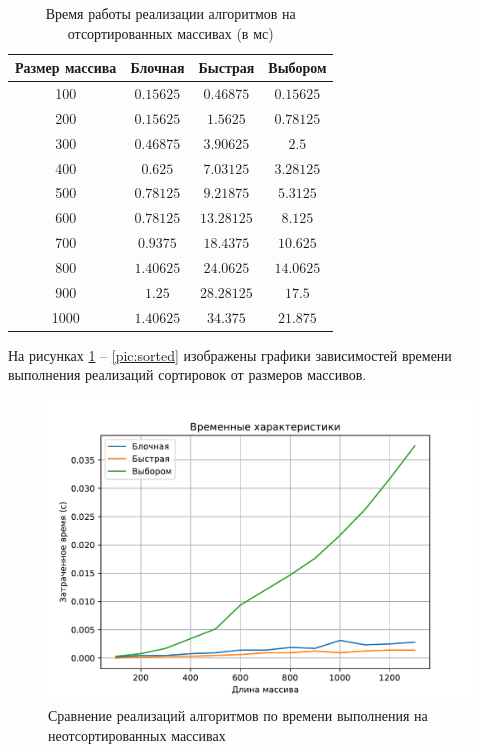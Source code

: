 \begin{table}[h]
	\begin{center}
		\begin{threeparttable}
			\captionsetup{justification=raggedright,singlelinecheck=off}
			\caption{Время работы реализации алгоритмов на отсортированных массивах (в мс)}
			\label{tbl:time_measurements_rand}
			\begin{tabular}{|c|c|c|c|}
				\hline
				Размер массива & Блочная & Быстрая & Выбором \\
				\hline
				100 &$ 0.15625 $&$ 0.46875 $&$ 0.15625 $\\
				\hline
				200 &$ 0.15625 $&$ 1.5625 $&$ 0.78125 $\\
				\hline
				300 &$ 0.46875 $&$ 3.90625 $&$ 2.5 $\\
				\hline
				400 &$ 0.625 $&$ 7.03125 $&$ 3.28125 $\\
				\hline
				500 &$ 0.78125 $&$ 9.21875 $&$ 5.3125 $\\
				\hline
				600 &$ 0.78125 $&$ 13.28125 $&$ 8.125 $\\
				\hline
				700 &$ 0.9375 $&$ 18.4375 $&$ 10.625 $\\
				\hline
				800 &$ 1.40625 $&$ 24.0625 $&$ 14.0625 $\\
				\hline
				900 &$ 1.25 $&$ 28.28125 $&$ 17.5 $\\
				\hline
				1000 &$ 1.40625 $&$ 34.375 $&$ 21.875 $\\
				\hline
			\end{tabular}
		\end{threeparttable}
	\end{center}
\end{table}

\clearpage
На рисунках \ref{pic:random} -- \ref{pic:sorted} изображены графики зависимостей времени выполнения реализаций сортировок от размеров массивов.

\begin{figure}[H]
	\centering
	\includegraphics[scale=0.62]{assets/plots/cpu-random.pdf}
	\caption{Сравнение реализаций алгоритмов по времени выполнения на неотсортированных массивах}
	\label{pic:random}
\end{figure}

